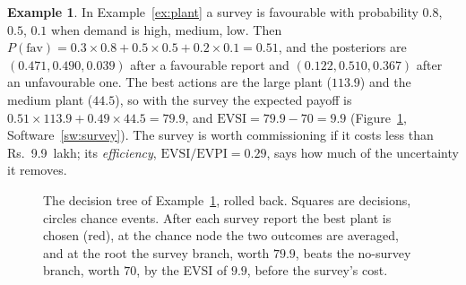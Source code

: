 \documentclass[11pt,a4paper]{article}
\numberwithin{equation}{section}
\theoremstyle{definition}
\newtheorem{exa}[thm]{Example}
\begin{document}
\begin{exa}
\label{ex:survey}
In Example~\ref{ex:plant} a survey is favourable with probability $0.8$, $0.5$, $0.1$ when demand is high, medium, low. Then $P(\text{fav}) = 0.3 \times 0.8 + 0.5 \times 0.5 + 0.2 \times 0.1 = 0.51$, and the posteriors are $(0.471, 0.490, 0.039)$ after a favourable report and $(0.122, 0.510, 0.367)$ after an unfavourable one. The best
actions are the large plant ($113.9$) and the medium plant ($44.5$), so with the survey the expected payoff is $0.51 \times 113.9 + 0.49 \times 44.5 = 79.9$, and $\text{EVSI} = 79.9 - 70 = 9.9$ (Figure~\ref{fig:tree}, Software~\ref{sw:survey}). The survey is worth commissioning if it costs less than Rs.~9.9~lakh; its
\emph{efficiency}, $\text{EVSI}/\text{EVPI} = 0.29$, says how much of the uncertainty it removes.
\end{exa}

\begin{figure}[H]
\centering
{}
\caption{The decision tree of Example~\ref{ex:survey}, rolled back. Squares are decisions, circles chance events. After each survey report the best plant is chosen (red), at the chance node the two outcomes are averaged, and at the root the survey branch, worth $79.9$, beats the no-survey branch, worth $70$, by the EVSI of $9.9$, before the survey's cost.}
\label{fig:tree}
\end{figure}
\end{document}
